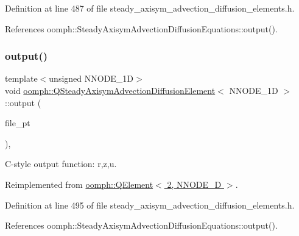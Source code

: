 Definition at line 487 of file steady\+\_\+axisym\+\_\+advection\+\_\+diffusion\+\_\+elements.\+h.



References oomph\+::\+Steady\+Axisym\+Advection\+Diffusion\+Equations\+::output().

\mbox{\label{classoomph_1_1QSteadyAxisymAdvectionDiffusionElement_a9af8f58f84ee30a6fdb2357afd8df51c}} 
\subsubsection{\texorpdfstring{output()}{output()}\hspace{0.1cm}{\footnotesize\ttfamily [3/4]}}
{\footnotesize\ttfamily template$<$unsigned N\+N\+O\+D\+E\+\_\+1D$>$ \\
void \hyperlink{classoomph_1_1QSteadyAxisymAdvectionDiffusionElement}{oomph\+::\+Q\+Steady\+Axisym\+Advection\+Diffusion\+Element}$<$ N\+N\+O\+D\+E\+\_\+1D $>$\+::output (\begin{DoxyParamCaption}\item[{F\+I\+LE $\ast$}]{file\+\_\+pt }\end{DoxyParamCaption})\hspace{0.3cm}{\ttfamily [inline]}, {\ttfamily [virtual]}}



C-\/style output function\+: r,z,u. 



Reimplemented from \hyperlink{classoomph_1_1QElement_3_012_00_01NNODE__1D_01_4_a08e9ce84ba8787b25935f18c00996a5d}{oomph\+::\+Q\+Element$<$ 2, N\+N\+O\+D\+E\+\_\+D $>$}.



Definition at line 495 of file steady\+\_\+axisym\+\_\+advection\+\_\+diffusion\+\_\+elements.\+h.



References oomph\+::\+Steady\+Axisym\+Advection\+Diffusion\+Equations\+::output().

\mbox{\label{classoomph_1_1QSteadyAxisymAdvectionDiffusionElement_ad4d1e0792228024edcb5e8d188fbe326}} 
